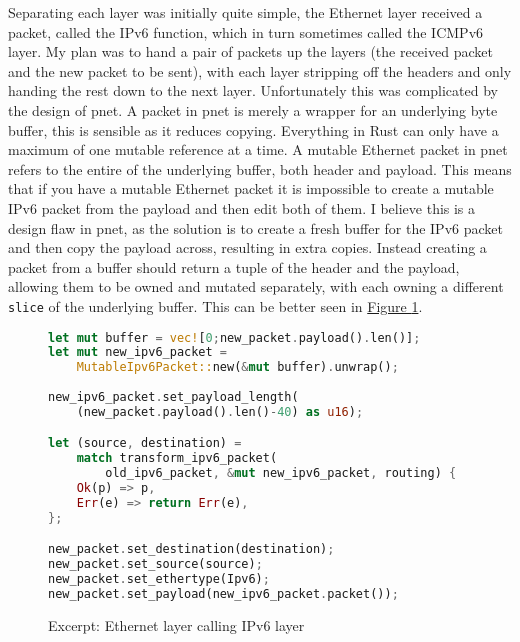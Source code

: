 \documentclass[12pt,a4paper,twoside,openright]{report}
\begin{document}
Separating each layer was initially quite simple, the Ethernet layer received a packet, called the IPv6 function, which in turn sometimes called the ICMPv6 layer.  My plan was to hand a pair of packets up the layers (the received packet and the new packet to be sent), with each layer stripping off the headers and only handing the rest down to the next layer.  Unfortunately this was complicated by the design of pnet.  A packet in pnet is merely a wrapper for an underlying byte buffer, this is sensible as it reduces copying.  Everything in Rust can only have a maximum of one mutable reference at a time.  A mutable Ethernet packet in pnet refers to the entire of the underlying buffer, both header and payload.  This means that if you have a mutable Ethernet packet it is impossible to create a mutable IPv6 packet from the payload and then edit both of them.  I believe this is a design flaw in pnet, as the solution is to create a fresh buffer for the IPv6 packet and then copy the payload across, resulting in extra copies. Instead creating a packet from a buffer should return a tuple of the header and the payload, allowing them to be owned and mutated separately, with each owning a different \verb!slice! of the underlying buffer. This can be better seen in  \hyperref[fig::mutability]{Figure }\ref{fig::mutability}.

\begin{figure}
\centering
\begin{varwidth}{\linewidth}
\begin{lstlisting}[language=Rust]
let mut buffer = vec![0;new_packet.payload().len()];
let mut new_ipv6_packet = 
    MutableIpv6Packet::new(&mut buffer).unwrap();
    
new_ipv6_packet.set_payload_length(
    (new_packet.payload().len()-40) as u16);

let (source, destination) = 
    match transform_ipv6_packet(
        old_ipv6_packet, &mut new_ipv6_packet, routing) {
    Ok(p) => p,
    Err(e) => return Err(e),
};

new_packet.set_destination(destination);
new_packet.set_source(source);
new_packet.set_ethertype(Ipv6);
new_packet.set_payload(new_ipv6_packet.packet());
\end{lstlisting}
\end{varwidth}
\caption{Excerpt: Ethernet layer calling IPv6 layer}
\label{fig::mutability}
\end{figure}

\bigskip
\end{document}
